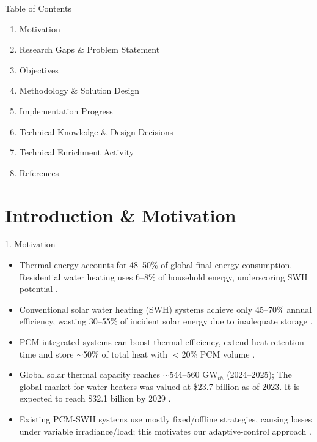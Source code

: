 \documentclass[aspectratio=169, 11pt]{beamer}
\begin{document}
\begin{frame}{Table of Contents}
\begin{enumerate}
    \item Motivation
    \item Research Gaps \& Problem Statement
    \item Objectives
    \item Methodology \& Solution Design
    \item Implementation Progress
    \item Technical Knowledge \& Design Decisions
    \item Technical Enrichment Activity
    \item References
\end{enumerate}
\end{frame}

\section{Introduction \& Motivation}

\begin{frame}{1. Motivation}
\begin{itemize}
    \item Thermal energy accounts for 48--50\% of global final energy consumption. Residential water heating uses 6--8\% of household energy, underscoring SWH potential \cite{AlMamun2023SWHReview}.
    \item Conventional solar water heating (SWH) systems achieve only 45--70\% annual efficiency, wasting 30--55\% of incident solar energy due to inadequate storage \cite{AlMamun2023SWHReview}.
    \item PCM-integrated systems can boost thermal efficiency, extend heat retention time and store $\sim$50\% of total heat with $<$20\% PCM volume \cite{Singh2025PCMSWH, Hamza2025PCMReview, Rathore2024ThermalPCM}.
    \item Global solar thermal capacity reaches $\sim$544--560 GW$_{th}$ (2024--2025); The global market for water heaters was valued at \$23.7 billion as of 2023. It is expected to reach \$32.1 billion by 2029 \cite{OdoiYorke2025AI_SWH}.
    \item Existing PCM-SWH systems use mostly fixed/offline strategies, causing losses under variable irradiance/load; this motivates our adaptive-control approach \cite{Barqawi2025MLPCMSWH, Emami2026DRLSolar}.
\end{itemize}
\end{frame}
\end{document}
